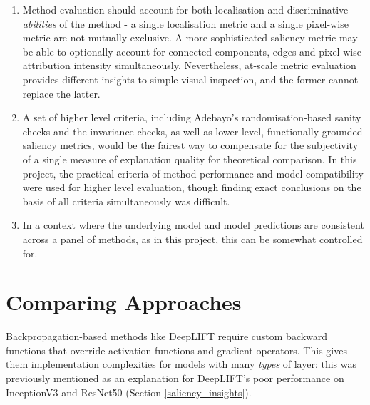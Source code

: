 \documentclass[main]{subfiles}
\begin{document}
\begin{enumerate}
\item Method evaluation should account for both localisation and discriminative \textit{abilities} of the method - a single localisation metric and a single pixel-wise metric are not mutually exclusive. A more sophisticated saliency metric may be able to optionally account for connected components, edges and pixel-wise attribution intensity simultaneously. Nevertheless, at-scale metric evaluation provides different insights to simple visual inspection, and the former cannot replace the latter.
\item A set of higher level criteria, including Adebayo's randomisation-based sanity checks and the invariance checks, as well as lower level, functionally-grounded saliency metrics, would be the fairest way to compensate for the subjectivity of a single measure of explanation quality for theoretical comparison. In this project, the practical criteria of method performance and model compatibility were used for higher level evaluation, though finding exact conclusions on the basis of all criteria simultaneously was difficult.
\item In a context where the underlying model and model predictions are consistent across a panel of methods, as in this project, this can be somewhat controlled for.


\end{enumerate}











\section{Comparing Approaches}
Backpropagation-based methods like DeepLIFT require custom backward functions that override activation functions and gradient operators. This gives them implementation complexities for models with many \textit{types} of layer: this was previously mentioned as an explanation for DeepLIFT's poor performance on InceptionV3 and ResNet50 (Section \ref{saliency_insights}).
\end{document}
